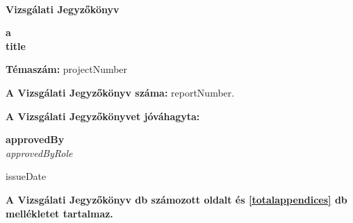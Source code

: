 \documentclass[a4paper,12pt]{article}
\begin{document}
	
	
	\thispagestyle{firstpage}
	
	\begin{flushleft}
		{\footnotesize  
			\textbf{
				 \\
				\vspace{-2mm} 
			}
		}
	\end{flushleft}
	
	\vfill
	
	\begin{center}
		{\Huge \textbf{Vizsgálati Jegyzőkönyv}}
	\end{center}
	
	\vfill
	
	\begin{center}
		\large
		\textbf{a} \\
		\textbf{{{title}}}
	\end{center}
	
	\vfill
	
	\begin{center}
		\textbf{Témaszám:} {{projectNumber}}
	\end{center}    
	
	\vfill
	
	\begin{center}
		\textbf{A Vizsgálati Jegyzőkönyv száma:} {{reportNumber}}.
	\end{center}
	
	\begin{center}
		\textbf{A Vizsgálati Jegyzőkönyvet jóváhagyta:}
	\end{center}    
	
	\vfill
	
	\begin{center}
		\textbf{{{approvedBy}}}\\
		\textit{{{approvedByRole}}} \\
	\end{center}    
	
	\vfill
	
	\begin{center}
		{{issueDate}}
	\end{center}    
	
	\vfill
	
	\begin{center}
		\textbf{A Vizsgálati Jegyzőkönyv \pageref{LastPage} db számozott oldalt és \ref{totalappendices} db mellékletet tartalmaz.}
	\end{center}    
	
\end{document}

